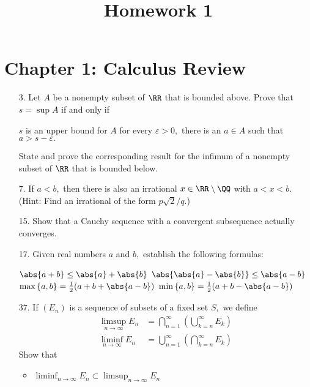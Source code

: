\documentclass{article}
\begin{document}
\title{Homework 1}
\maketitle
\thispagestyle{fancy}

\section*{Chapter 1: Calculus Review}

\begin{itemize}
	\item[3.] Let $A$ be a nonempty subset of $\RR$ that is bounded above. Prove that $s=\sup A$ if and only if
		\begin{enumerate}[(i)]
			\ii $s$ is an upper bound for $A$
			\ii for every $\varepsilon>0,$ there is an $a\in A$ such that $a>s-\varepsilon.$
		\end{enumerate}
		State and prove the corresponding result for the infimum of a nonempty subset of $\RR$ that is bounded below.

	\item[7.] If $a<b,$ then there is also an irrational $x\in \RR\setminus\QQ$ with $a<x<b.$ (Hint: Find an irrational of the form $p\sqrt{2}/q.$)

	\item[15.] Show that a Cauchy sequence with a convergent subsequence actually converges.

	\item[17.] Given real numbers $a$ and $b,$ establish the following formulas:
		\begin{itemize}
				\ii $\abs{a+b}\le \abs{a}+\abs{b}$
				\ii $\abs{\abs{a}-\abs{b}}\le\abs{a-b}$
				\ii $\max\left\{ a, b \right\} = \frac{1}{2}(a+b+\abs{a-b})$
				\ii $\min\left\{ a, b \right\} = \frac{1}{2} (a+b-\abs{a-b})$
		\end{itemize}

	\item[37.] If $(E_n)$ is a sequence of subsets of a fixed set $S,$ we define
		\begin{align*}
			\limsup_{n\to\infty} E_n &=\bigcap_{n=1}^\infty\left( \bigcup_{k=n}^\infty E_k \right) \\
			\liminf_{n\to\infty} E_n &= \bigcup_{n=1}^\infty\left( \bigcap_{k=n}^\infty E_k \right)
		\end{align*}
		Show that
		\begin{itemize}
			\item  $\displaystyle\liminf_{n\to\infty}E_n \subset \limsup_{n\to\infty} E_n$


\end{itemize}
\end{itemize}
\end{document}
